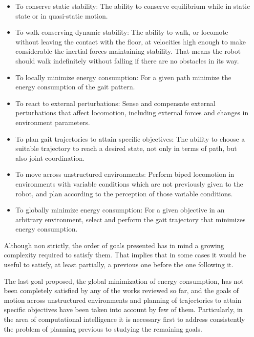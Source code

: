 \begin{itemize}

\item To conserve static stability: The ability to conserve
  equilibrium while in static state or in quasi-static motion.

\item To walk conserving dynamic stability: The ability to walk, or
  locomote without leaving the contact with the floor, at velocities
  high enough to make considerable the inertial forces maintaining
  stability. That means the robot should walk indefinitely without
  falling if there are no obstacles in its way.

\item To locally minimize energy consumption: For a given path
  minimize the energy consumption of the gait pattern.

\item To react to external perturbations: Sense and compensate
  external perturbations that affect locomotion, including external
  forces and changes in environment parameters.

\item To plan gait trajectories to attain specific objectives: The
  ability to choose a suitable trajectory to reach a desired state,
  not only in terms of path, but also joint coordination.

\item To move across unstructured environments: Perform biped
  locomotion in environments with variable conditions which are not
  previously given to the robot, and plan according to the perception
  of those variable conditions.

\item To globally minimize energy consumption: For a given objective
  in an arbitrary environment, select and perform the gait trajectory
  that minimizes energy consumption.

\end{itemize}


Although non strictly, the order of goals presented has in mind a
growing complexity required to satisfy them. That implies that in some
cases it would be useful to satisfy, at least partially, a previous
one before the one following it.

The last goal proposed, the global minimization of energy consumption,
has not been completely satisfied by any of the works reviewed so far,
and the goals of motion across unstructured environments and planning
of trajectories to attain specific objectives have been taken into
account by few of them. Particularly, in the area of computational
intelligence it is necessary first to address consistently the problem
of planning previous to studying the remaining goals.



